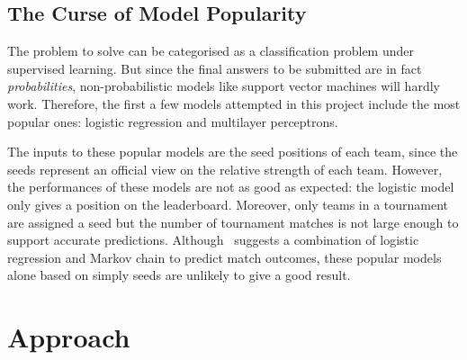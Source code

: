 \subsection{The Curse of Model Popularity}
The problem to solve can be categorised as a classification problem under supervised learning. But since the final answers to be submitted are in fact \emph{probabilities}, non-probabilistic models like support vector machines will hardly work. Therefore, the first a few models attempted in this project include the most popular ones: logistic regression and multilayer perceptrons. 

The inputs to these popular models are the seed positions of each team, since the seeds represent an official view on the relative strength of each team. However, the performances of these models are not as good as expected: the logistic model only gives a  position on the leaderboard. Moreover, only teams in a tournament are assigned a seed but the number of tournament matches is not large enough to support accurate predictions. Although~\cite{PJ06} suggests a combination of logistic regression and Markov chain to predict match outcomes, these popular models alone based on simply seeds are unlikely to give a good result. 

\section{Approach}
